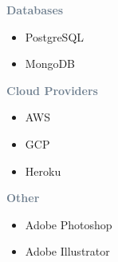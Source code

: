 \textcolor{SlateGrey}{\textbf{Databases}}
\begin{multicols}{2}
    \begin{itemize}
        \item PostgreSQL
        \item MongoDB
    \end{itemize}
\end{multicols}

\textcolor{SlateGrey}{\textbf{Cloud Providers}}
\begin{multicols}{2}
    \begin{itemize}
        \item AWS
        \item GCP
        \item Heroku
    \end{itemize}
\end{multicols}

\textcolor{SlateGrey}{\textbf{Other}}
\begin{multicols}{2}
    \begin{itemize}
        \item Adobe Photoshop
        \item Adobe Illustrator
    \end{itemize}
\end{multicols}
\vspace{50px}
